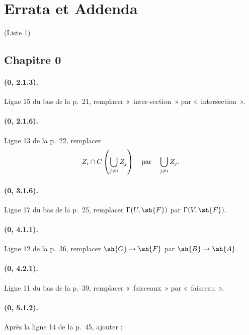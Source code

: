 {}
\section*{Errata et Addenda}
\thispagestyle{plain}
\begin{center}
\large (Liste 1)
\end{center}

\subsection*{Chapitre 0}

\paragraph{(0, 2.1.3).}
Ligne 15 du bas de la p.~21, remplacer «~inter-section~» par
«~intersection~».

\paragraph{(0, 2.1.6).}
Ligne 13 de la p.~22, remplacer
\[
  Z_i\cap C\left(\bigcup_{j\ne i}Z_j\right)
  \quad\hbox{par}\quad
  \bigcup_{j\ne i}Z_j.
\]

\paragraph{(0, 3.1.6).}
Ligne 17 du bas de la p.~25, remplacer
$\Gamma(U,\sh{F})$ par $\Gamma(V,\sh{F})$.

\paragraph{(0, 4.1.1).}
Ligne 12 de la p.~36, remplacer $\sh{G}\to\sh{F}$ par
$\sh{B}\to\sh{A}$.

\paragraph{(0, 4.2.1).}
Ligne 11 du bas de la p.~39, remplacer «~faisceaux~» par «~faisceau~».

\paragraph{(0, 5.1.2).}
Après la ligne 14 de la p.~45, ajouter :


